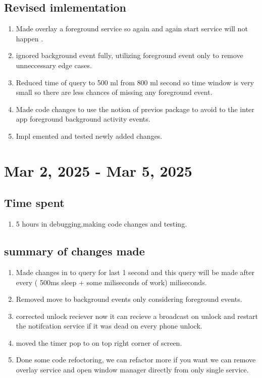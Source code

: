 \documentclass[12pt]{article}
\begin{document}
\begin{enumerate}
    \subsection{Revised imlementation}
    \begin{enumerate}
        \item Made overlay a foreground service so again and again start service will not happen .
        \item ignored background event fully, utilizing foreground event only to remove unneccessary edge cases.
        \item Reduced time of query to 500 ml from 800 ml second so time window is very small so there are less chances of missing any foreground event.
        \item Made code changes to use the notion of previos package to avoid to the inter app foreground background activity events.
        \item Impl  emented and tested newly added changes.
    \end{enumerate}
    
    \end{enumerate}
     \section{Mar 2, 2025 -  Mar 5, 2025}
        \subsection{Time spent}
        \begin{enumerate}
            \item 5 hours in debugging,making code changes and testing.
        \end{enumerate}
         \subsection{summary of changes made}
         \begin{enumerate}
             \item Made changes in to query for last 1 second and this query will be made after every ( 500ms sleep + some miliseconds of work) miliseconds.
             \item Removed move to background events only considering foreground events.
             \item corrected unlock reciever now it can recieve a broadcast on unlock and restart the notifcation service if it was dead on every phone unlock.
             \item moved the timer pop to  on top right corner of screen.
             \item Done some code refoctoring, we can refactor more if you want we can remove overlay service and open window manager directly from only single service.
         \end{enumerate}
    
\end{document}
